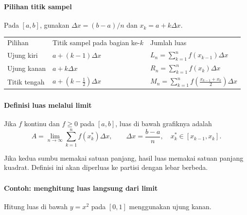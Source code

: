 \documentclass{../../kalkulus-ppt}
\begin{document}
\begin{frame}
\frametitle{\insertsection}
\framesubtitle{Pilihan titik sampel}

Pada $[a,b]$, gunakan $\Delta x=(b-a)/n$ dan $x_k=a+k\Delta x$.
\begin{center}
\begin{tabular}{lll}
\rowcolor{HIMAtua!20}Pilihan & Titik sampel pada bagian ke-$k$ & Jumlah luas\\
Ujung kiri & $a+(k-1)\Delta x$ & $L_n=\sum_{k=1}^n f(x_{k-1})\Delta x$\\
Ujung kanan & $a+k\Delta x$ & $R_n=\sum_{k=1}^n f(x_k)\Delta x$\\
Titik tengah & $a+(k-\tfrac12)\Delta x$ & $M_n=\sum_{k=1}^n f(\tfrac{x_{k-1}+x_k}{2})\Delta x$
\end{tabular}
\end{center}
\end{frame}

\begin{frame}
\frametitle{\insertsection}
\framesubtitle{Definisi luas melalui limit}

\begin{definisi}
Jika $f$ kontinu dan $f\ge0$ pada $[a,b]$, luas di bawah grafiknya adalah
\[A=\lim_{n\to\infty}\sum_{k=1}^n f(x_k^*)\Delta x,
\qquad \Delta x=\frac{b-a}{n},\quad x_k^*\in[x_{k-1},x_k].\]
\end{definisi}
Jika kedua sumbu memakai satuan panjang, hasil luas memakai satuan panjang kuadrat. Definisi ini akan diperluas ke partisi dengan lebar berbeda.
\end{frame}

\begin{frame}
\frametitle{\insertsection}
\framesubtitle{Contoh: menghitung luas langsung dari limit}

\begin{contoh}
Hitung luas di bawah $y=x^2$ pada $[0,1]$ menggunakan ujung kanan.
\end{contoh}
\end{frame}
\end{document}
